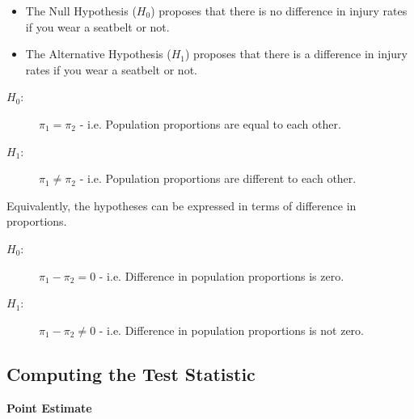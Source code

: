 \documentclass[a4paper,12pt]{article}
\begin{document}
\begin{itemize}
    \item The Null Hypothesis ($H_0$) proposes that there is no difference in injury rates if you wear a seatbelt or not.
    \item The Alternative Hypothesis ($H_1$) proposes that there is a difference in injury rates if you wear a seatbelt or not.
\end{itemize}
\medskip
\begin{description}
\item[$H_0$:] $\pi_1 = \pi_2$  - i.e. Population proportions are equal to each other.
\item[$H_1$:] $\pi_1 \neq \pi_2$ - i.e. Population proportions are different to each other.
\end{description}
\medskip 
\noindent Equivalently, the hypotheses can be expressed in terms of difference in proportions.
\begin{description}
\item[$H_0$:] $\pi_1 - \pi_2 = 0$ - i.e. Difference in population proportions is zero.
\item[$H_1$:] $\pi_1 - \pi_2 \neq 0$ - i.e. Difference in population proportions is not zero.
\end{description}

\newpage
\subsection*{Computing the Test Statistic}
\noindent \textbf{Point Estimate}
\end{document}
